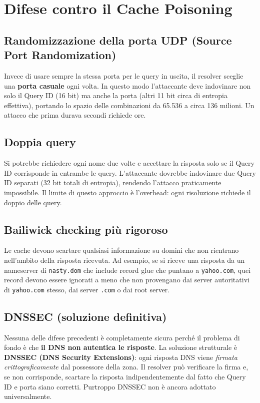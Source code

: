\documentclass{article}
\begin{document}
\section*{Difese contro il Cache Poisoning}

\subsection*{Randomizzazione della porta UDP (Source Port Randomization)}

Invece di usare sempre la stessa porta per le query in uscita, il resolver
sceglie una \textbf{porta casuale} ogni volta. In questo modo l'attaccante
deve indovinare non solo il Query ID (16 bit) ma anche la porta (altri 11
bit circa di entropia effettiva), portando lo spazio delle combinazioni da
65.536 a circa 136 milioni. Un attacco che prima durava secondi richiede
ore.

\subsection*{Doppia query}

Si potrebbe richiedere ogni nome due volte e accettare la risposta solo se
il Query ID corrisponde in entrambe le query. L'attaccante dovrebbe indovinare
due Query ID separati (32 bit totali di entropia), rendendo l'attacco
praticamente impossibile. Il limite di questo approccio è l'overhead: ogni
risoluzione richiede il doppio delle query.

\subsection*{Bailiwick checking più rigoroso}

Le cache devono scartare qualsiasi informazione su domini che non rientrano
nell'ambito della risposta ricevuta. Ad esempio, se si riceve una risposta
da un nameserver di \texttt{nasty.dom} che include record glue che puntano
a \texttt{yahoo.com}, quei record devono essere ignorati a meno che non
provengano dai server autoritativi di \texttt{yahoo.com} stesso, dai server
\texttt{.com} o dai root server.

\subsection*{DNSSEC (soluzione definitiva)}

Nessuna delle difese precedenti è completamente sicura perché il problema
di fondo è che \textbf{il DNS non autentica le risposte}. La soluzione
strutturale è \textbf{DNSSEC (DNS Security Extensions)}: ogni risposta DNS
viene \emph{firmata crittograficamente} dal possessore della zona. Il
resolver può verificare la firma e, se non corrisponde, scartare la
risposta indipendentemente dal fatto che Query ID e porta siano corretti.
Purtroppo DNSSEC non è ancora adottato universalmente.
\end{document}
